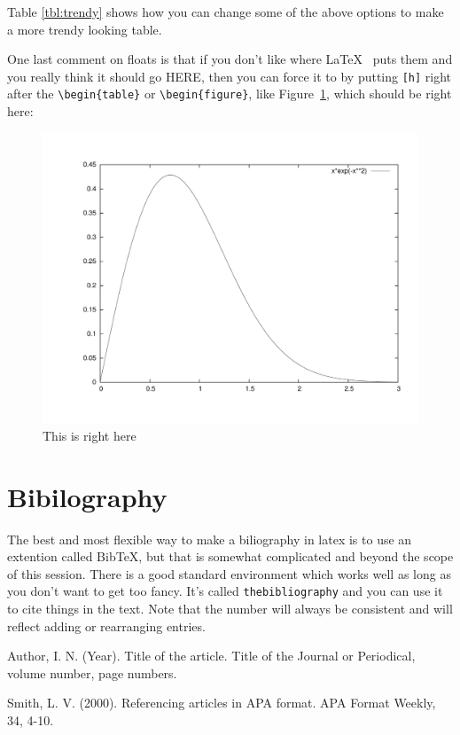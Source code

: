 \documentclass[twocolumn,10 pt,showpacs,preprintnumbers,amsmath,amssymb]{revtex4-1}
\begin{document}
Table \ref{tbl:trendy} shows how you can change some of the above
options to make a more trendy looking table.

One last comment on floats is that if you don't like where \LaTeX~ puts
them and you really think it should go HERE, then you can force it to by
putting \texttt{[h]} right after the \verb_\begin{table}_ or
\verb_\begin{figure}_, like Figure~\ref{fig:here}, which should be right
here:
\begin{figure}[h]
    \centering
    \includegraphics[scale=0.25,angle=-90]{graph.pdf}
    \caption{This is right here}
    \label{fig:here}
\end{figure}

\section{Bibilography}

The best and most flexible way to make a biliography in latex is to use
an extention called Bib\TeX, but that is somewhat complicated and beyond
the scope of this session.  There is a good standard environment which
works well as long as you don't want to get too fancy.  It's called
\texttt{thebibliography} and you can use it to cite things in the
text\cite{smith}.  Note that the number will always be consistent and
will reflect adding or rearranging entries\cite{author}.

\begin{thebibliography}{99}

 Author, I. N. (Year). Title of the article. Title of the Journal or Periodical, volume number, page numbers.

 Smith, L. V. (2000). Referencing articles in APA format. APA Format Weekly, 34, 4-10.

\end{thebibliography}
\end{document}
